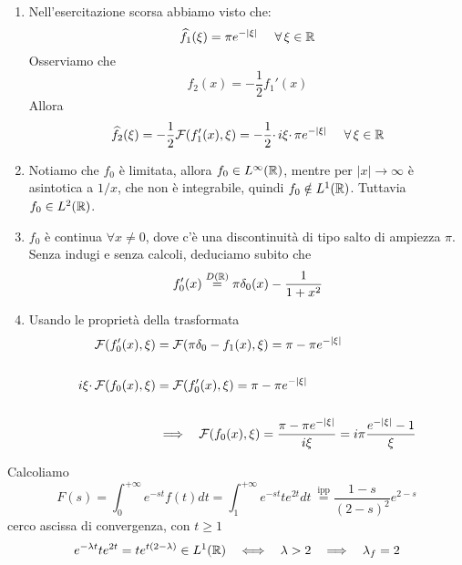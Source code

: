 \begin{enumerate}
\item Nell'esercitazione scorsa abbiamo visto che:\begin{equation*}
\hat{f}_{1}( \xi ) =\pi e^{-| \xi | } \ \ \ \ \forall \xi \in \RR 
\end{equation*}Osserviamo che\begin{equation*}
f_{2}( x) =-\frac{1}{2} f_{1} '( x)
\end{equation*}Allora\begin{equation*}
\hat{f}_{2}( \xi ) =-\frac{1}{2}\Fc ( f_{1} '( x) ,\xi ) =-\frac{1}{2} \cdotp i\xi \cdotp \pi e^{-| \xi | } \ \ \ \ \forall \xi \in \RR 
\end{equation*}
\item Notiamo che $f_{0}$ è limitata, allora $f_{0} \in L^{\infty }(\mathbb{R} )$, mentre per $| x| \rightarrow \infty $ è asintotica a $1/x$, che non è integrabile, quindi $f_{0} \notin L^{1}(\mathbb{R} )$. Tuttavia $f_{0} \in L^{2}(\mathbb{R} )$.
\item $f_{0}$ è continua $\forall x\neq 0$, dove c'è una discontinuità di tipo salto di ampiezza $\pi $. Senza indugi e senza calcoli, deduciamo subito che\begin{equation*}
f_{0} '( x)\overset{D(\mathbb{R} )}{=} \pi \delta _{0}( x) -\frac{1}{1+x^{2}}
\end{equation*}
\item Usando le proprietà della trasformata\begin{align*}
\mathcal{F} ( f_{0} '( x) ,\xi ) & =\mathcal{F} ( \pi \delta _{0} -f_{1}( x) ,\xi ) =\pi -\pi e^{-| \xi | }\\
 & \\
i\xi \cdotp\mathcal{F} ( f_{0}( x) ,\xi ) & =\mathcal{F} ( f_{0} '( x) ,\xi ) =\pi -\pi e^{-| \xi | }\\
 & \\
 & \implies \ \ \mathcal{F} ( f_{0}( x) ,\xi ) =\frac{\pi -\pi e^{-| \xi | }}{i\xi } =i\pi \frac{e^{-| \xi | } -1}{\xi }
\end{align*}
\end{enumerate}
\Soluzione

Calcoliamo
\begin{equation*}
F( s) =\int ^{+\infty }_{0} e^{-st} f( t) dt=\int ^{+\infty }_{1} e^{-st} te^{2t} dt\ \overset{\text{ipp}}{=}\frac{1-s}{( 2-s)^{2}} e^{2-s}
\end{equation*}
cerco ascissa di convergenza, con $t\geqslant 1$
\begin{equation*}
e^{-\lambda t} te^{2t} =te^{t( 2-\lambda )} \in L^{1}(\mathbb{R} ) \ \ \iff \ \ \lambda  >2\ \ \implies \ \ \lambda _{f} =2
\end{equation*}
\Soluzione

